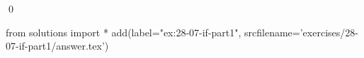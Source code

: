 
\begin{ex}
  \label{ex:28-07-if-part1}
  
  \qed
\end{ex}
\begin{python0}
from solutions import *
add(label="ex:28-07-if-part1",
    srcfilename='exercises/28-07-if-part1/answer.tex')
\end{python0}
